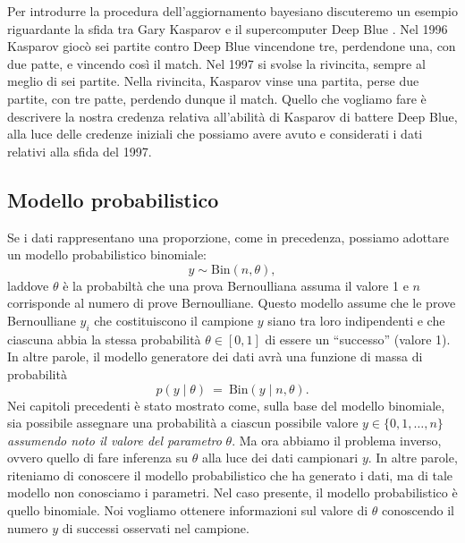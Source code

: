 \documentclass[
  10pt,
  italian,
  a4paper,
  extrafontsizes,onecolumn,openright
  ]{memoir}
\begin{document}
Per introdurre la procedura dell'aggiornamento bayesiano discuteremo un esempio riguardante la sfida tra Gary Kasparov e il supercomputer Deep Blue \autocite{Johnson2022bayesrules}. Nel 1996 Kasparov giocò sei partite contro Deep Blue vincendone tre, perdendone una, con due patte, e vincendo così il match. Nel 1997 si svolse la rivincita, sempre al meglio di sei partite. Nella rivincita, Kasparov vinse una partita, perse due partite, con tre patte, perdendo dunque il match. Quello che vogliamo fare è descrivere la nostra credenza relativa all'abilità di Kasparov di battere Deep Blue, alla luce delle credenze iniziali che possiamo avere avuto e considerati i dati relativi alla sfida del 1997.

\hypertarget{modello-probabilistico}{%
\subsection{Modello probabilistico}\label{modello-probabilistico}}

Se i dati rappresentano una proporzione, come in precedenza, possiamo adottare un modello probabilistico binomiale:
\begin{equation}
y  \sim \mbox{Bin}(n, \theta),
\label{eq:binomialmodel}
\end{equation}
laddove \(\theta\) è la probabiltà che una prova Bernoulliana assuma il valore 1 e \(n\) corrisponde al numero di prove Bernoulliane. Questo modello assume che le prove Bernoulliane \(y_i\) che costituiscono il campione \(y\) siano tra loro indipendenti e che ciascuna abbia la stessa probabilità \(\theta \in [0, 1]\) di essere un ``successo'' (valore 1). In altre parole, il modello generatore dei dati avrà una funzione di massa di probabilità
\[
p(y \mid \theta)
\ = \
\mbox{Bin}(y \mid n, \theta).
\]
Nei capitoli precedenti è stato mostrato come, sulla base del modello binomiale, sia possibile assegnare una probabilità a ciascun possibile valore \(y \in \{0, 1, \dots, n\}\) \emph{assumendo noto il valore del parametro} \(\theta\). Ma ora abbiamo il problema inverso, ovvero quello di fare inferenza su \(\theta\) alla luce dei dati campionari \(y\). In altre parole, riteniamo di conoscere il modello probabilistico che ha generato i dati, ma di tale modello non conosciamo i parametri. Nel caso presente, il modello probabilistico è quello binomiale. Noi vogliamo ottenere informazioni sul valore di \(\theta\) conoscendo il numero \(y\) di successi osservati nel campione.
\end{document}
